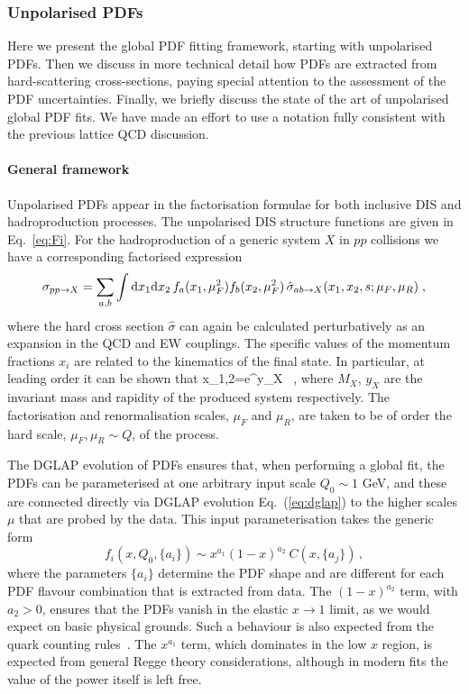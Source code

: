 \subsubsection{Unpolarised PDFs}
\label{sec:unpPDFs}

Here we present the global PDF fitting framework, starting with unpolarised PDFs.
%
Then we discuss in more technical detail how PDFs are extracted
from hard-scattering cross-sections, paying special attention
to the assessment of the PDF uncertainties.
%
Finally, we briefly discuss the state of the art of unpolarised
global PDF fits.
%
We have made an effort to use a notation fully consistent
with the previous lattice QCD discussion.

\paragraph{General framework}
%
Unpolarised PDFs appear in the factorisation formulae for both inclusive DIS and hadroproduction processes. The unpolarised DIS structure functions are given in Eq.~\eqref{eq:Fi}.
For the hadroproduction of a generic system $X$ in $pp$ collisions we have
a corresponding factorised expression
\begin{equation}
  \label{eq:LHCxsec}
\sigma_{pp\to X}=\sum_{a,b}\int {\rm d}x_1 {\rm d}x_2\, f_a(x_1,\mu_F^2)f_b(x_2,\mu_F^2)\,\hat{\sigma}_{ab\to X}(x_1,x_2,s;\mu_{F},\mu_R)\;,
\end{equation}
where the hard cross section $\hat{\sigma}$ can again be calculated perturbatively as an expansion in the QCD and EW couplings.
%
The specific values of the momentum fractions
$x_i$ are related to the kinematics of the final state.
%
In particular, at leading order it can be shown that
\be
x_{1,2}=e^{\pm y_X} \, ,
\ee
where $M_X$, $y_X$ are the invariant mass and rapidity of the produced system respectively.
%
The factorisation and renormalisation scales, $\mu_F$ and $\mu_R$, are taken to be of order the hard scale, $\mu_F,\mu_R
\sim Q$, of the process.

The DGLAP evolution of PDFs ensures that, when performing a global fit, the PDFs can be parameterised at one arbitrary input scale $Q_0\sim 1$ GeV, and these are connected directly via
DGLAP evolution
Eq.~(\ref{eq:dglap}) to the higher scales $\mu$ that are probed by the data.
This input parameterisation takes the generic form
\begin{equation}
\label{eq:pdffunc}
f_{i}(x,Q_0,\{a_i\})\sim x^{a_1}(1-x)^{a_2}\:C(x,\{a_j\})\, ,
\end{equation}
where the parameters $\{a_i\}$ determine the PDF shape
and are different for each PDF flavour combination that
is extracted from data.
%
The $(1-x)^{a_2}$ term, with $a_{2}>0$, ensures that the PDFs
vanish in the elastic $x\to 1$ limit, as we would expect on basic physical grounds. 
%
Such a behaviour is also expected from the quark
counting rules~\cite{Brodsky:1973kr,Ball:2016spl}.
%
The $x^{a_1}$ term, which dominates in the low $x$
region, is expected from general Regge theory considerations, although in modern fits the value of the power itself is left free.


